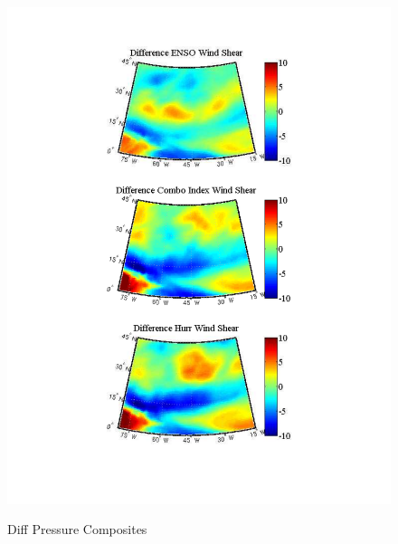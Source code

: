 \documentclass[]{article}
\begin{document}
\begin{figure}[ht]
\begin{minipage}[b]{0.55\linewidth}
\includegraphics[width=\textwidth]{figures/comboIndex/composites/compareMDRCompositesWindShear.pdf}
\caption{Diff Pressure Composites}
\label{fig:figure21}
\end{minipage}
\hspace{0cm}
\begin{minipage}[b]{0.55\linewidth}
\label{fig:figure22}
\end{minipage}
\end{figure}

\clearpage


\end{document}
